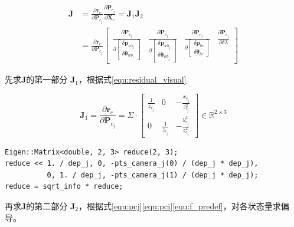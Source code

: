 \documentclass[12pt,a4paper]{article}
\begin{document}
\begin{enumerate}
\begin{equation}
\begin{aligned}
\mathbf{J} 
&= 
\frac{\partial \mathbf{r}_{c}}{\partial \mathbf{P}_{c_{j}}}
\frac{\partial \mathbf{P}_{c_{j}}}{\partial \mathbf{X}_{c}}
=
\mathbf{J}_1 \mathbf{J}_2 \\
&=
\frac{\partial \mathbf{r}_{c}}{\partial \mathbf{P}_{c_{j}}}
\begin{bmatrix}
\frac{\partial \mathbf{P}_{c_{j}}}
{\partial\left[\begin{array}{c}{\delta \mathbf{p}_{w b_{i}}} \\ 
{\delta \boldsymbol{\theta}_{w b_{i}}}\end{array}\right]} 
&
\frac{\partial \mathbf{P}_{c_{j}}}
{\partial\left[\begin{array}{c}{\delta \mathbf{p}_{w b_{j}}} \\ 
{\delta \boldsymbol{\theta}_{w b_{j}}}\end{array}\right]} 
&
\frac{\partial \mathbf{P}_{c_{j}}}
{\partial\left[\begin{array}{c}{\delta \mathbf{p}_{bc}} \\ 
{\delta \boldsymbol{\theta}_{bc}}\end{array}\right]} 
&
\frac{\partial \mathbf{P}_{c_{j}}}{\partial \delta \lambda}
\end{bmatrix}
\end{aligned}
\end{equation}

先求$\mathbf{J}$的第一部分 $\mathbf{J}_1$，根据式\eqref{equ:residual_visual}

\begin{equation}
\mathbf{J}_1 =
\frac{\partial \mathbf{r}_{c}}{\partial \mathbf{P}_{c_{j}}} = 
\Sigma \cdot
\left[\begin{array}{ccc}
{\frac{1}{z_{c_{j}}}} & {0} & {-\frac{x_{c_{j}}}{z_{c_{j}}^{2}}} \\ 
{0} & {\frac{1}{z_{c_{j}}}} & {-\frac{y_{c_{j}}^{2}}{z_{c_{j}}^{2}}}
\end{array}\right]
\in \mathbb{R}^{2 \times 3}
\end{equation}

\begin{lstlisting}
Eigen::Matrix<double, 2, 3> reduce(2, 3);
reduce << 1. / dep_j, 0, -pts_camera_j(0) / (dep_j * dep_j),
          0, 1. / dep_j, -pts_camera_j(1) / (dep_j * dep_j);
reduce = sqrt_info * reduce;
\end{lstlisting}

再求$\mathbf{J}$的第二部分 $\mathbf{J}_2$，根据式\eqref{equ:pcj}\eqref{equ:pci}\eqref{equ:f_predef}，对各状态量求偏导。


\end{enumerate}
\end{document}
